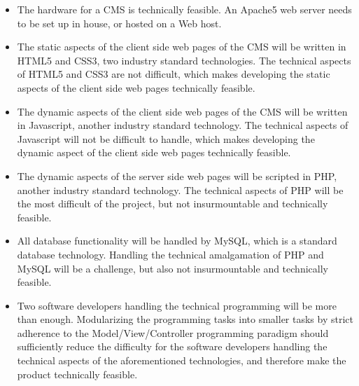 \documentclass[11pt]{article}
\begin{document}
\begin{enumerate}
    \begin{itemize}
    \item The hardware for a CMS is technically feasible. An Apache5 web server needs to be set up in house, or hosted on a Web host.
    \item The static aspects of the client side web pages of the CMS will be written in HTML5 and CSS3, two industry standard technologies. The technical aspects of HTML5 and CSS3 are not difficult, which makes developing the static aspects of the client side web pages technically feasible.
    \item The dynamic aspects of the client side web pages of the CMS will be written in Javascript, another industry standard technology. The technical aspects of Javascript will not be difficult to handle, which makes developing the dynamic aspect of the client side web pages technically feasible.
    \item The dynamic aspects of the server side web pages will be scripted in PHP, another industry standard technology. The technical aspects of PHP will be the most difficult of the project, but not insurmountable and technically feasible.
    \item All database functionality will be handled by MySQL, which is a standard database technology. Handling the technical amalgamation of PHP and MySQL will be a challenge, but also not insurmountable and technically feasible.
    \item Two software developers handling the technical programming will be more than enough. Modularizing the programming tasks into smaller tasks by strict adherence to the Model/View/Controller programming paradigm should sufficiently reduce the difficulty for the software developers handling the technical aspects of the aforementioned technologies, and therefore make the product technically feasible.
    
    \end{itemize}
    
    
    
    \end{enumerate}
    
    
   
    
    
    
    
    
    
    
    
    
\end{document}

